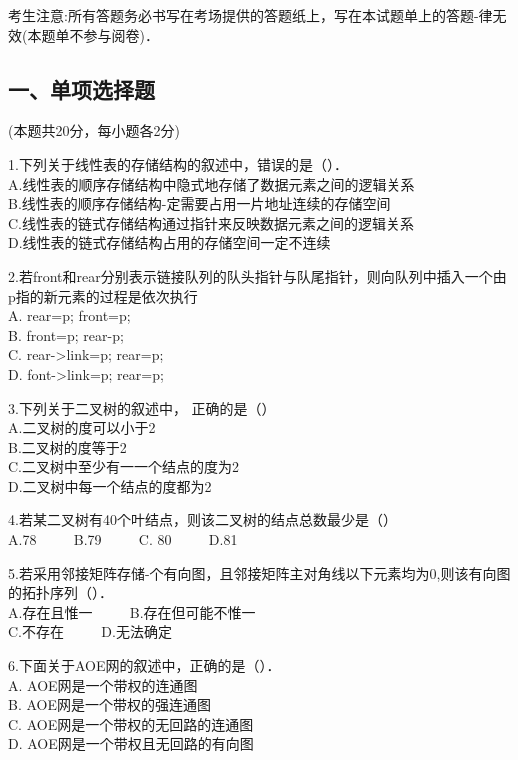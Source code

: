 
考生注意:所有答题务必书写在考场提供的答题纸上，写在本试题单上的答题-律无效(本题单不参与阅卷)．

\subsection{一、单项选择题}
(本题共20分，每小题各2分)

1.下列关于线性表的存储结构的叙述中，错误的是（）． \\
A.线性表的顺序存储结构中隐式地存储了数据元素之间的逻辑关系 \\
B.线性表的顺序存储结构-定需要占用一片地址连续的存储空间 \\
C.线性表的链式存储结构通过指针来反映数据元素之间的逻辑关系 \\
D.线性表的链式存储结构占用的存储空间一定不连续

2.若front和rear分别表示链接队列的队头指针与队尾指针，则向队列中插入一个由p指的新元素的过程是依次执行 \\
A. rear=p; front=p; \\
B. front=p; rear-p; \\
C. rear->link=p; rear=p; \\
D. font->link=p; rear=p;

3.下列关于二叉树的叙述中， 正确的是（） \\
A.二叉树的度可以小于2 \\
B.二叉树的度等于2 \\
C.二叉树中至少有一一个结点的度为2 \\
D.二叉树中每一个结点的度都为2

4.若某二叉树有40个叶结点，则该二叉树的结点总数最少是（） \\
A.78 $\qquad$ B.79 $\qquad$ C. 80 $\qquad$ D.81

5.若采用邻接矩阵存储-个有向图，且邻接矩阵主对角线以下元素均为0,则该有向图的拓扑序列（）． \\
A.存在且惟一 $\qquad$ B.存在但可能不惟一 \\
C.不存在 $\qquad$ D.无法确定

6.下面关于AOE网的叙述中，正确的是（）． \\
A. AOE网是一个带权的连通图 \\
B. AOE网是一个带权的强连通图 \\
C. AOE网是一个带权的无回路的连通图 \\
D. AOE网是一个带权且无回路的有向图


